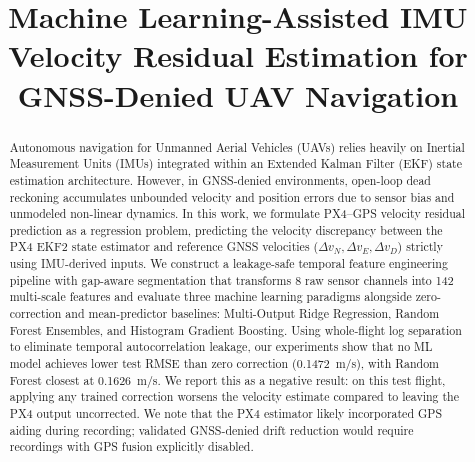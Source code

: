 \documentclass[conference]{IEEEtran}
\begin{document}
\title{Machine Learning-Assisted IMU Velocity Residual Estimation for GNSS-Denied UAV Navigation}

\author{
\and
{}
\and
{}
}

\maketitle

\begin{abstract}
Autonomous navigation for Unmanned Aerial Vehicles (UAVs) relies heavily on Inertial Measurement Units (IMUs) integrated within an Extended Kalman Filter (EKF) state estimation architecture. However, in GNSS-denied environments, open-loop dead reckoning accumulates unbounded velocity and position errors due to sensor bias and unmodeled non-linear dynamics. In this work, we formulate PX4--GPS velocity residual prediction as a regression problem, predicting the velocity discrepancy between the PX4 EKF2 state estimator and reference GNSS velocities ($\Delta v_N, \Delta v_E, \Delta v_D$) strictly using IMU-derived inputs. We construct a leakage-safe temporal feature engineering pipeline with gap-aware segmentation that transforms 8 raw sensor channels into 142 multi-scale features and evaluate three machine learning paradigms alongside zero-correction and mean-predictor baselines: Multi-Output Ridge Regression, Random Forest Ensembles, and Histogram Gradient Boosting. Using whole-flight log separation to eliminate temporal autocorrelation leakage, our experiments show that no ML model achieves lower test RMSE than zero correction (0.1472~m/s), with Random Forest closest at 0.1626~m/s. We report this as a negative result: on this test flight, applying any trained correction worsens the velocity estimate compared to leaving the PX4 output uncorrected. We note that the PX4 estimator likely incorporated GPS aiding during recording; validated GNSS-denied drift reduction would require recordings with GPS fusion explicitly disabled.
\end{abstract}
\end{document}
